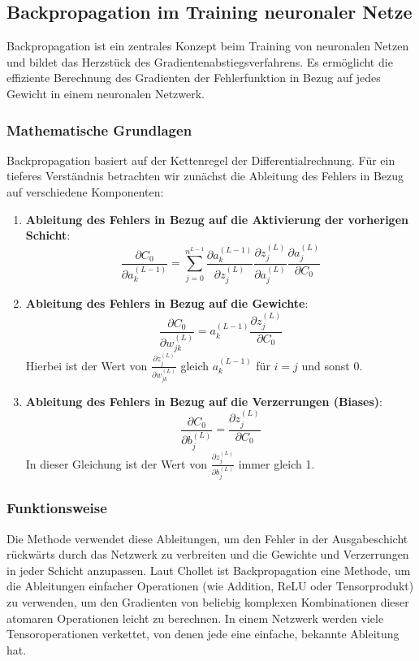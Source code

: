 \subsection{Backpropagation im Training neuronaler Netze}

Backpropagation ist ein zentrales Konzept beim Training von neuronalen Netzen und bildet das Herzstück des Gradientenabstiegsverfahrens. Es ermöglicht die effiziente Berechnung des Gradienten der Fehlerfunktion in Bezug auf jedes Gewicht in einem neuronalen Netzwerk.

\subsubsection{Mathematische Grundlagen}

Backpropagation basiert auf der Kettenregel der Differentialrechnung. Für ein tieferes Verständnis betrachten wir zunächst die Ableitung des Fehlers in Bezug auf verschiedene Komponenten:

\begin{enumerate}
    \item \textbf{Ableitung des Fehlers in Bezug auf die Aktivierung der vorherigen Schicht}:
    \[
    \frac{\partial C_0}{\partial a_k^{(L-1)}} = \sum_{j=0}^{n^{L-1}} \frac{\partial a_k^{(L-1)}}{\partial z_j^{(L)}} \frac{\partial z_j^{(L)}}{\partial a_j^{(L)}} \frac{\partial a_j^{(L)}}{\partial C_0}
    \]

    \item \textbf{Ableitung des Fehlers in Bezug auf die Gewichte}:
    \[
    \frac{\partial C_0}{\partial w_{jk}^{(L)}} = a_k^{(L-1)} \frac{\partial z_j^{(L)}}{\partial C_0}
    \]
    Hierbei ist der Wert von \(\frac{\partial z_j^{(L)}}{\partial w_{jk}^{(L)}}\) gleich \(a_k^{(L-1)}\) für \(i=j\) und sonst 0.

    \item \textbf{Ableitung des Fehlers in Bezug auf die Verzerrungen (Biases)}:
    \[
    \frac{\partial C_0}{\partial b_j^{(L)}} = \frac{\partial z_j^{(L)}}{\partial C_0}
    \]
    In dieser Gleichung ist der Wert von \(\frac{\partial z_j^{(L)}}{\partial b_j^{(L)}}\) immer gleich 1.
\end{enumerate}

\subsubsection{Funktionsweise}

Die Methode verwendet diese Ableitungen, um den Fehler in der Ausgabeschicht rückwärts durch das Netzwerk zu verbreiten und die Gewichte und Verzerrungen in jeder Schicht anzupassen. Laut Chollet \cite[p.~80]{Chollet2021} ist Backpropagation eine Methode, um die Ableitungen einfacher Operationen (wie Addition, ReLU oder Tensorprodukt) zu verwenden, um den Gradienten von beliebig komplexen Kombinationen dieser atomaren Operationen leicht zu berechnen. In einem Netzwerk werden viele Tensoroperationen verkettet, von denen jede eine einfache, bekannte Ableitung hat.

